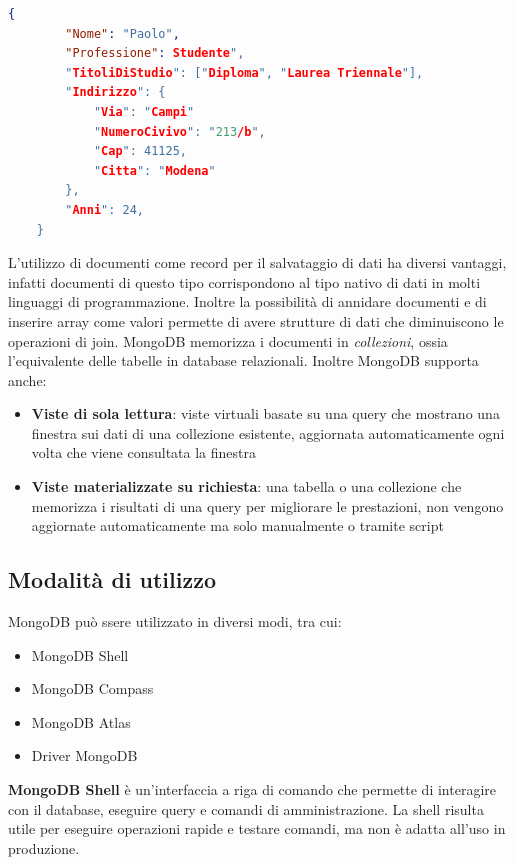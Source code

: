 \documentclass{article}
\begin{document}
\begin{lstlisting}[language=json, caption={Esempio di JSON}]
    {
        "Nome": "Paolo",
        "Professione": Studente",
        "TitoliDiStudio": ["Diploma", "Laurea Triennale"],
        "Indirizzo": {
            "Via": "Campi"
            "NumeroCivivo": "213/b",
            "Cap": 41125,
            "Citta": "Modena"
        },
        "Anni": 24,
    }
\end{lstlisting}


L'utilizzo di documenti come record per il salvataggio di dati ha diversi vantaggi, infatti documenti di questo tipo corrispondono 
al tipo nativo di dati in molti linguaggi di programmazione. Inoltre la possibilità di annidare documenti e di inserire array 
come valori permette di avere strutture di dati che diminuiscono le operazioni di join.
MongoDB memorizza i documenti in \textit{collezioni}, ossia l'equivalente delle tabelle in database relazionali. Inoltre MongoDB
supporta anche:
\begin{itemize}
    \item \textbf{Viste di sola lettura}: viste virtuali basate su una query che mostrano una finestra sui dati di una collezione esistente, aggiornata automaticamente ogni volta che viene consultata la finestra
    \item \textbf{Viste materializzate su richiesta}: una tabella o una collezione che memorizza i risultati di una query per migliorare le prestazioni, non vengono aggiornate automaticamente ma solo manualmente o tramite script
\end{itemize}

\subsection{Modalità di utilizzo}
MongoDB può ssere utilizzato in diversi modi, tra cui:
\begin{itemize}
    \item MongoDB Shell
    \item MongoDB Compass
    \item MongoDB Atlas
    \item Driver MongoDB
\end{itemize}

\textbf{MongoDB Shell} è un'interfaccia a riga di comando che permette di interagire con il database, eseguire query
e comandi di amministrazione. La shell risulta utile per eseguire operazioni rapide e testare comandi, ma non è adatta
all'uso in produzione.
\end{document}

